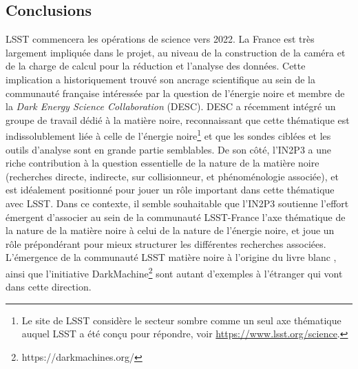 \documentclass[12pt]{article}
\begin{document}
\vspace{-1em} \subsection*{Conclusions} \vspace{-0.5em}

LSST commencera les opérations de science vers 2022. La France est très largement impliquée dans le projet, au niveau de la construction de la caméra et de la charge de calcul pour la réduction et l'analyse des données. Cette implication a historiquement trouvé son ancrage scientifique au sein de la communauté française intéressée par la question de l'énergie noire et membre de la {\it Dark Energy Science Collaboration} (DESC). DESC a récemment intégré un groupe de travail dédié à la matière noire, reconnaissant que cette thématique est indissolublement liée à celle de l'énergie noire\footnote{Le site de LSST considère le secteur sombre comme un seul axe thématique auquel LSST a été conçu pour répondre, voir \href{https://www.lsst.org/science}{https://www.lsst.org/science}. } et que les sondes ciblées et les outils d'analyse sont en grande partie semblables.
De son côté, l'IN2P3 a une riche contribution à la question essentielle de la nature de la matière noire (recherches directe, indirecte, sur collisionneur, et phénoménologie associée), et est idéalement positionné pour jouer un rôle important dans cette thématique avec LSST. Dans ce contexte, il semble souhaitable que l'IN2P3 soutienne l'effort émergent d'associer au sein de la communauté LSST-France l'axe thématique de la nature de la matière noire à celui de la nature de l'énergie noire, et joue un rôle prépondérant pour mieux structurer les différentes recherches associées. L'émergence de la communauté LSST matière noire à l'origine du livre blanc \citep{drlica-wagner_2019_lsst_dark_matter}, ainsi que l'initiative {\sc DarkMachine}\footnote{https://darkmachines.org/} sont autant d'exemples à l'étranger qui vont dans cette direction. 





\def\bibname{References}
\begingroup
  \small
  \setlength{\bibsep}{0pt plus 0.5ex}
  
  
\endgroup

\end{document}
